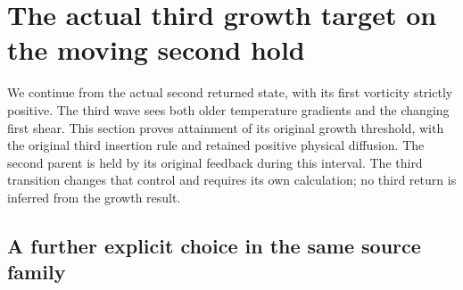 \section{The actual third growth target on the moving second hold}
\label{tge:section}

We continue from the actual second returned state, with its first
vorticity strictly positive. The third wave sees both older temperature
gradients and the changing first shear. This section proves attainment
of its original growth threshold, with the original third insertion
rule and retained positive physical diffusion. The second parent is
held by its original feedback during this interval. The third
transition changes that control and requires its own calculation;
no third return is inferred from the growth result.

\subsection{A further explicit choice in the same source family}

